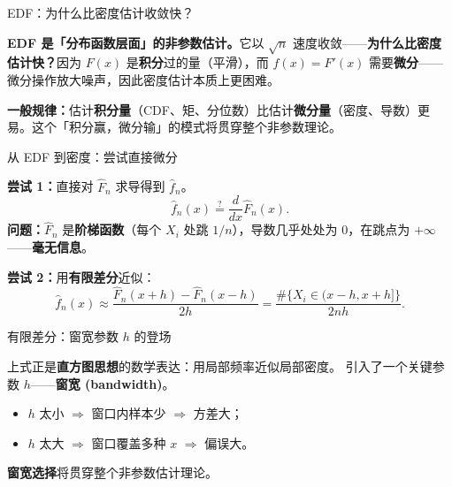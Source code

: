 \documentclass[aspectratio=169, 10pt]{beamer}
\begin{document}
\begin{frame}{EDF：为什么比密度估计收敛快？}

  \begin{keybox}
    \textbf{EDF 是「分布函数层面」的非参数估计。}它以 $\sqrt{n}$ 速度收敛——\textbf{为什么比密度估计快？}因为 $F(x)$ 是\textbf{积分}过的量（平滑），而 $f(x)=F'(x)$ 需要\textbf{微分}——微分操作放大噪声，因此密度估计本质上更困难。
  \end{keybox}

  \begin{highlightbox}
    \textbf{一般规律：}估计\textbf{积分量}（CDF、矩、分位数）比估计\textbf{微分量}（密度、导数）更易。这个「积分赢，微分输」的模式将贯穿整个非参数理论。
  \end{highlightbox}

\end{frame}


\begin{frame}{从 EDF 到密度：尝试直接微分}

  \begin{highlightbox}
    \textbf{尝试 1：}直接对 $\hat F_n$ 求导得到 $\hat f_n$。
    \[
      \hat f_n(x) \overset{?}{=} \frac{d}{dx}\hat F_n(x).
    \]
    \textbf{问题：}$\hat F_n$ 是\textbf{阶梯函数}（每个 $X_i$ 处跳 $1/n$），导数几乎处处为 $0$，在跳点为 $+\infty$——\textbf{毫无信息}。
  \end{highlightbox}

  \textbf{尝试 2：}用\textbf{有限差分}近似：
  \[
    \hat f_n(x) \approx \frac{\hat F_n(x+h) - \hat F_n(x-h)}{2h}
    = \frac{\#\{X_i \in (x-h, x+h]\}}{2nh}.
  \]

\end{frame}


\begin{frame}{有限差分：窗宽参数 $h$ 的登场}

  \begin{keybox}
    上式正是\textbf{直方图思想}的数学表达：用局部频率近似局部密度。
    引入了一个关键参数 $h$——\textbf{窗宽 (bandwidth)}。
    \begin{itemize}
      \item $h$ 太小 $\Rightarrow$ 窗口内样本少 $\Rightarrow$ 方差大；
      \item $h$ 太大 $\Rightarrow$ 窗口覆盖多种 $x$ $\Rightarrow$ 偏误大。
    \end{itemize}
    \textbf{窗宽选择}将贯穿整个非参数估计理论。
  \end{keybox}

\end{frame}
\end{document}
